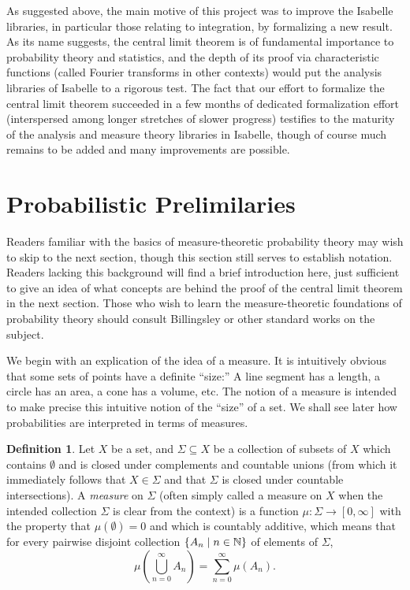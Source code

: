 \documentclass{amsart}
\theoremstyle{definition}
\newtheorem{definition}[theorem]{Definition}
\theoremstyle{remark}
\newcommand{\bldset}[2]{\{{#1}\mid{#2}\}}
\begin{document}
As suggested above, the main motive of this project was to improve the Isabelle libraries, in particular those relating to integration, by formalizing a new result. As its name suggests, the central limit theorem is of fundamental importance to probability theory and statistics, and the depth of its proof via characteristic functions (called Fourier transforms in other contexts) would put the analysis libraries of Isabelle to a rigorous test. The fact that our effort to formalize the central limit theorem succeeded in a few months of dedicated formalization effort (interspersed among longer stretches of slower progress) testifies to the maturity of the analysis and measure theory libraries in Isabelle, though of course much remains to be added and many improvements are possible.

\section{Probabilistic Prelimilaries}

Readers familiar with the basics of measure-theoretic probability theory may wish to skip to the next section, though this section still serves to establish notation. Readers lacking this background will find a brief introduction here, just sufficient to give an idea of what concepts are behind the proof of the central limit theorem in the next section. Those who wish to learn the measure-theoretic foundations of probability theory should consult Billingsley or other standard works on the subject.

We begin with an explication of the idea of a measure. It is intuitively obvious that some sets of points have a definite ``size:'' A line segment has a length, a circle has an area, a cone has a volume, etc. The notion of a measure is intended to make precise this intuitive notion of the ``size'' of a set. We shall see later how probabilities are interpreted in terms of measures.

\begin{definition}
Let $X$ be a set, and $\Sigma \subseteq X$ be a collection of subsets of $X$ which contains $\emptyset$ and is closed under complements and countable unions (from which it immediately follows that $X \in \Sigma$ and that $\Sigma$ is closed under countable intersections). A {\em measure} on $\Sigma$ (often simply called a measure on $X$ when the intended collection $\Sigma$ is clear from the context) is a function $\mu\colon \Sigma \rightarrow [0, \infty]$ with the property that $\mu(\emptyset) = 0$ and which is countably additive, which means that for every pairwise disjoint collection $\bldset{A_n}{n \in \N}$ of elements of $\Sigma$,
\[ \mu\left(\bigcup_{n = 0}^\infty A_n\right) = \sum_{n=0}^\infty \mu(A_n). \]
\end{definition}
\end{document}

